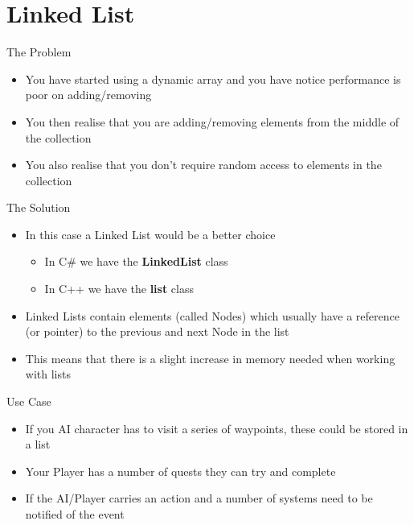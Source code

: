 \part{Linked List}
\frame{\partpage}

\begin{frame}{The Problem}
	\begin{itemize}
		\pause \item You have started using a dynamic array and you have notice performance is poor on adding/removing
		 \pause \item You then realise that you are adding/removing elements from the middle of the collection
		 \pause \item You also realise that you don't require random access to elements in the collection
	\end{itemize}
\end{frame}

\begin{frame}{The Solution}
	\begin{itemize}
		\pause \item In this case a Linked List would be a better choice
		\begin{itemize}
			\pause \item In C\# we have the \textbf{LinkedList} class
			\pause \item In C++ we have the \textbf{list} class
		\end{itemize}
		\pause \item Linked Lists contain elements (called Nodes) which usually have a reference (or pointer) to the previous and next Node in the list
		\pause \item This means that there is a slight increase in memory needed when working with lists
	\end{itemize}
\end{frame}

\begin{frame}{Use Case}
	\begin{itemize}
		\pause \item If you AI character has to visit a series of waypoints, these could be stored in a list
		\pause \item Your Player has a number of quests they can try and complete
		\pause \item If the AI/Player carries an action and a number of systems need to be notified of the event 
	\end{itemize}
\end{frame}


